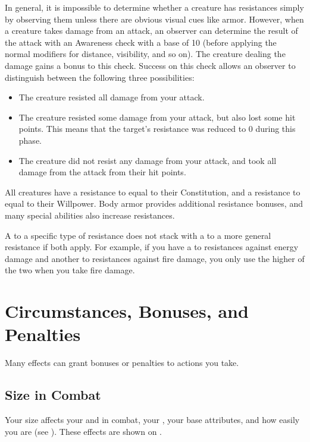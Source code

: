         In general, it is impossible to determine whether a creature has resistances simply by observing them unless there are obvious visual cues like armor.
        However, when a creature takes damage from an attack, an observer can determine the result of the attack with an Awareness check with a base  of 10 (before applying the normal modifiers for distance, visibility, and so on).
        The creature dealing the damage gains a  bonus to this check.
        Success on this check allows an observer to distinguish between the following three possibilities:
        \begin{itemize}
            \item The creature resisted all damage from your attack.
            \item The creature resisted some damage from your attack, but also lost some hit points.
                This means that the target's resistance was reduced to 0 during this phase.
            \item The creature did not resist any damage from your attack, and took all damage from the attack from their hit points.
        \end{itemize}

        All creatures have a resistance to  equal to their Constitution, and a resistance to  equal to their Willpower.
        Body armor provides additional resistance bonuses, and many special abilities also increase resistances.

         A  to a specific type of resistance does not stack with a  to a more general resistance if both apply.
        For example, if you have a  to resistances against energy damage and another  to resistances against fire damage, you only use the higher of the two when you take fire damage.

\section{Circumstances, Bonuses, and Penalties}

    Many effects can grant bonuses or penalties to actions you take.

    \subsection{Size in Combat}\label{Size in Combat}
        Your size affects your  and  in combat, your , your base attributes, and how easily you are  (see ).
        These effects are shown on .

